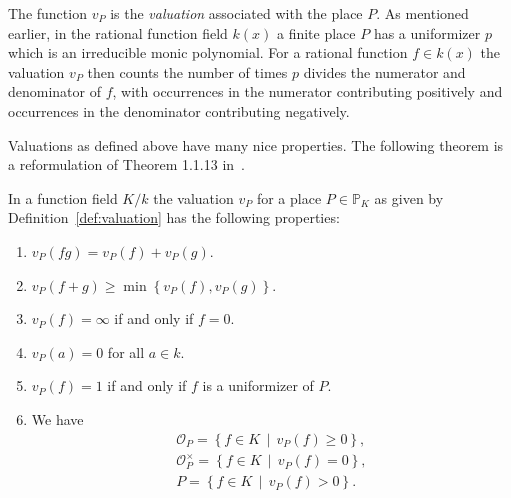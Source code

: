 The function \(v_{P}\) is the \textit{valuation} associated with the place \(P\). As mentioned earlier, in the rational function field \(k(x)\) a finite place \(P\) has a uniformizer \(p\) which is an irreducible monic polynomial. For a rational function \(f \in k(x)\) the valuation \(v_{P}\) then counts the number of times \(p\) divides the numerator and denominator of \(f\), with occurrences in the numerator contributing positively and occurrences in the denominator contributing negatively.

Valuations as defined above have many nice properties. The following theorem is a reformulation of Theorem 1.1.13 in~\cite{stichtenoth-2009-algebraic-function-fields}.

\begin{theorem}%
  \label{thm:valuation-properties}
  In a function field \(K / k\) the valuation \(v_{P}\) for a place \(P \in \mathbb{P}_{K}\) as given by Definition~\ref{def:valuation} has the following properties:
  \begin{enumerate}[label = {(\arabic*)}]
    \item%
      \label{prop:valuation-multiplication}
      \(v_{P}(fg) = v_{P}(f) + v_{P}(g)\).

    \item%
      \label{prop:valuation-addition}
      \(v_{P}(f + g) \geq \min{\left\{v_{P}(f), v_{P}(g)\right\}}\).

    \item%
      \label{prop:valuation-zero}
      \(v_{P}(f) = \infty\) if and only if \(f = 0\).

    \item
      \(v_{P}(a) = 0\) for all \(a \in k\).

    \item
      \(v_{P}(f) = 1\) if and only if \(f\) is a uniformizer of \(P\).

    \item
      We have
      \begin{align*}
        \mathcal{O}_{P} = \left\{ f \in K \,\middle|\, v_{P}(f) \geq 0 \right\},       \\
        \mathcal{O}_{P}^{\times} = \left\{ f \in K \,\middle|\, v_{P}(f) = 0 \right\}, \\
        P = \left\{ f \in K \,\middle|\, v_{P}(f) > 0 \right\}.
      \end{align*}
  \end{enumerate}
\end{theorem}

